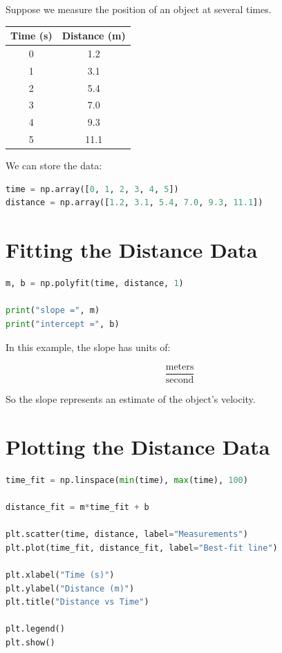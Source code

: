 \documentclass[11pt]{article}
\begin{document}
Suppose we measure the position of an object at several times.

\begin{center}
\begin{tabular}{cc}
\toprule
Time (s) & Distance (m) \\
\midrule
0 & 1.2 \\
1 & 3.1 \\
2 & 5.4 \\
3 & 7.0 \\
4 & 9.3 \\
5 & 11.1 \\
\bottomrule
\end{tabular}
\end{center}

We can store the data:

\begin{lstlisting}[language=Python]
time = np.array([0, 1, 2, 3, 4, 5])
distance = np.array([1.2, 3.1, 5.4, 7.0, 9.3, 11.1])
\end{lstlisting}

\section{Fitting the Distance Data}

\begin{lstlisting}[language=Python]
m, b = np.polyfit(time, distance, 1)

print("slope =", m)
print("intercept =", b)
\end{lstlisting}

In this example, the slope has units of:

\[
\frac{\text{meters}}{\text{second}}
\]

So the slope represents an estimate of the object's velocity.

\section{Plotting the Distance Data}

\begin{lstlisting}[language=Python]
time_fit = np.linspace(min(time), max(time), 100)

distance_fit = m*time_fit + b

plt.scatter(time, distance, label="Measurements")
plt.plot(time_fit, distance_fit, label="Best-fit line")

plt.xlabel("Time (s)")
plt.ylabel("Distance (m)")
plt.title("Distance vs Time")

plt.legend()
plt.show()
\end{lstlisting}
\end{document}
